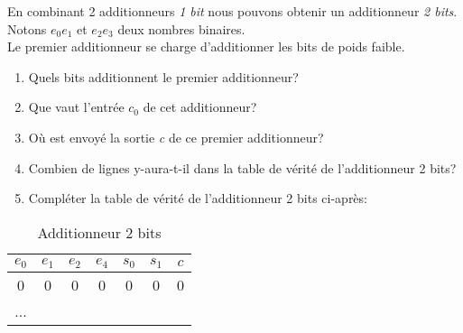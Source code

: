 \documentclass[a4paper,11pt]{article}
\begin{document}
\begin{exo}
En combinant 2 additionneurs \emph{1 bit} nous pouvons obtenir un additionneur \emph{2 bits}. Notons $e_0e_1$ et $e_2e_3$ deux nombres binaires. \\Le premier additionneur se charge d'additionner les bits de poids faible.
\begin{enumerate}
\item Quels bits additionnent le premier additionneur?
\item Que vaut l'entrée $c_0$ de cet additionneur?
\item Où est envoyé la sortie \emph{c} de ce premier additionneur?
\item Combien de lignes y-aura-t-il dans la table de vérité de l'additionneur 2 bits?
\item Compléter la table de vérité de l'additionneur 2 bits ci-après:
\end{enumerate}
\begin{table}[!h]
\begin{center}
\begin{tabular}{|*4{c|}|*3{c|}}
\hline 
$e_0$ & $e_1$ & $e_2$ & $e_4$ & $s_0$ & $s_1$ & $c$ \\ 
\hline 
0 & 0 & 0 & 0 & 0 & 0 & 0 \\ 
\hline 
... &  &  &  &  &  &  \\ 
\hline 
\end{tabular}
\caption{\label{addi}Additionneur 2 bits}
\end{center}
\end{table} 
\end{exo}
\end{document}
